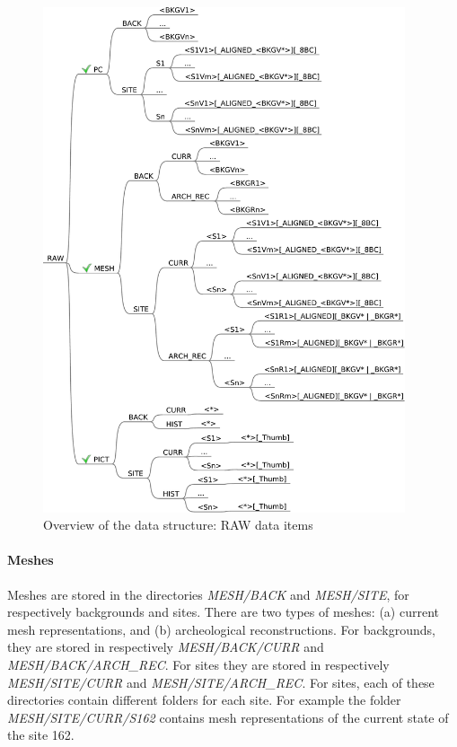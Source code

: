 \begin{figure}[!ht]
 \centering
 \includegraphics[width=0.95\textwidth]{fig/directory_structure_raw}
 \caption{Overview of the data structure: RAW data items}
 \label{fig:directory_structure_overview_raw}
\end{figure}

\paragraph{Meshes}
Meshes are stored in the directories \textit{MESH/BACK} and \textit{MESH/SITE}, for respectively backgrounds and sites. There are two types of meshes: (a) current  mesh representations, and (b) archeological reconstructions. For backgrounds, they are stored in respectively \textit{MESH/BACK/CURR} and \textit{MESH/BACK/ARCH\_REC}. For sites they are stored in respectively \textit{MESH/SITE/CURR} and \textit{MESH/SITE/ARCH\_REC}. For sites, each of these directories contain different folders for each site. For example the folder \textit{MESH/SITE/CURR/S162} contains mesh representations of the current state of the site 162. 

